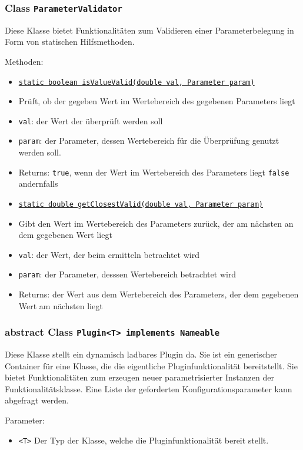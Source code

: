 \documentclass[parskip=full,11pt]{scrartcl}
\begin{document}
\subsubsection{Class \texttt{ParameterValidator}}

Diese Klasse bietet Funktionalitäten zum Validieren einer Parameterbelegung in Form von statischen Hilfsmethoden.

Methoden:

\begin{itemize} \itemsep -10pt
\item \underline{\texttt{static boolean isValueValid(double val, Parameter param)}}
\item[] Prüft, ob der gegeben Wert im Wertebereich des gegebenen Parameters liegt
\item[] \texttt{val}: der Wert der überprüft werden soll
\item[] \texttt{param}: der Parameter, dessen Wertebereich für die Überprüfung genutzt werden soll.
\item[] Returns: \texttt{true}, wenn der Wert im Wertebereich des Parameters liegt \texttt{false} andernfalls
\item \underline{\texttt{static double getClosestValid(double val, Parameter param)}}
\item[] Gibt den Wert im Wertebereich des Parameters zurück, der am nächsten an dem gegebenen Wert liegt
\item[] \texttt{val}: der Wert, der beim ermitteln betrachtet wird
\item[] \texttt{param}: der Parameter, desssen Wertebereich betrachtet wird
\item[] Returns: der Wert aus dem Wertebereich des Parameters, der dem gegebenen Wert am nächsten liegt
\end{itemize}

\subsubsection{abstract Class \texttt{Plugin<T> implements  Nameable}}

Diese Klasse stellt ein dynamisch ladbares Plugin da. Sie ist ein generischer Container für eine Klasse, die die eigentliche Pluginfunktionalität bereitstellt. Sie bietet Funktionalitäten zum erzeugen neuer parametrisierter Instanzen der Funktionalitätsklasse. Eine Liste der geforderten Konfigurationsparameter kann abgefragt werden.

Parameter:
\begin{itemize}\itemsep -10pt
\item \texttt{<T>} Der Typ der Klasse, welche die Pluginfunktionalität bereit stellt. 
\end{itemize}
\end{document}
